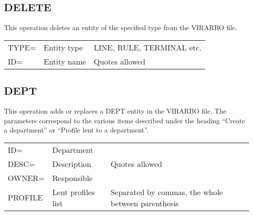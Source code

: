 \documentclass[letterpaper,10pt,english]{sphinxmanual}
\begin{document}

\subsection{DELETE}
\label{\detokenize{Installation_Guide:index-160}}\label{\detokenize{Installation_Guide:delete}}
This operation deletes an entity of the specified type from the VIRARBO file.


\begin{savenotes}\sphinxattablestart
\centering
\begin{tabulary}{\linewidth}[t]{|T|T|T|}
\hline
{}\relax &\relax &\relax \\
\hline
TYPE=
&
Entity type
&
LINE, RULE, TERMINAL etc.
\\
\hline
ID=
&
Entity name
&
Quotes allowed
\\
\hline
\end{tabulary}
\par
\sphinxattableend\end{savenotes}


\subsection{DEPT}
\label{\detokenize{Installation_Guide:index-161}}\label{\detokenize{Installation_Guide:dept}}
This operation adds or replaces a DEPT entity in the VIRARBO file. The parameters correspond to the various items
described under the heading “Create a department” or “Profile lent to a department”.


\begin{savenotes}\sphinxattablestart
\centering
\begin{tabulary}{\linewidth}[t]{|T|T|T|}
\hline
{}\relax &\relax &\relax \\
\hline
ID=
&
Department
&\\
\hline
DESC=
&
Description
&
Quotes allowed
\\
\hline
OWNER=
&
Responsible
&\\
\hline
PROFILE
&
Lent profiles list
&
Separated by commas, the whole between parenthesis
\\
\hline
\end{tabulary}
\par
\sphinxattableend\end{savenotes}
\end{document}
